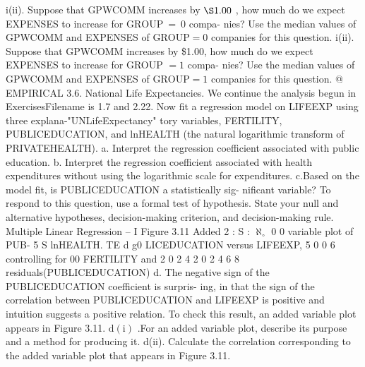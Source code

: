 \documentclass[11pt]{article}
\begin{document}
i(ii). Suppose that GPWCOMM increases by \(\S1 . 0 0\) , how much do
we expect EXPENSES to increase for \(\mathrm{G R O U P} ~=~ 0\) compa-
nies? Use the median values of GPWCOMM and EXPENSES of
\(\mathrm{G R O U P}=0\) companies for this question.
i(ii). Suppose that GPWCOMM increases by \$1.00, how much do
we expect EXPENSES to increase for GROUP \(= 1\) compa-
nies? Use the median values of GPWCOMM and EXPENSES of
\(\mathrm{G R O U P}=1\) companies for this question. @ EMPIRICAL
3.6. National Life Expectancies. We continue the analysis begun in ExercisesFilename is
1.7 and 2.22. Now fit a regression model on LIFEEXP using three explana-"UNLifeExpectancy"
tory variables, FERTILITY, PUBLICEDUCATION, and lnHEALTH (the
 natural logarithmic transform of PRIVATEHEALTH).
 a. Interpret the regression coefficient associated with public education.
b. Interpret the regression coefficient associated with health expenditures
without using the logarithmic scale for expenditures.
c.Based on the model fit, is PUBLICEDUCATION a statistically sig-
nificant variable? To respond to this question, use a formal test of
 hypothesis. State your null and alternative hypotheses, decision-making
criterion, and decision-making rule.
 Multiple Linear Regression -- I
Figure 3.11 Added 2 : S : \(\aleph_{\circ}\) 0 0
variable plot of PUB- 5 S
lnHEALTH. TE d g0
LICEDUCATION
versus LIFEEXP, 5 0 0
6
 controlling for 00
FERTILITY and
2 0
2
4 2 0 2 4 6 8
residuals(PUBLICEDUCATION)
 d. The negative sign of the PUBLICEDUCATION coefficient is surpris-
 ing, in that the sign of the correlation between PUBLICEDUCATION
 and LIFEEXP is positive and intuition suggests a positive relation. To
check this result, an added variable plot appears in Figure 3.11.
\(\mathrm{d ( i )}\) .For an added variable plot, describe its purpose and a method for
 producing it.
 d(ii). Calculate the correlation corresponding to the added variable plot
 that appears in Figure 3.11.
\clearpage
\end{document}
